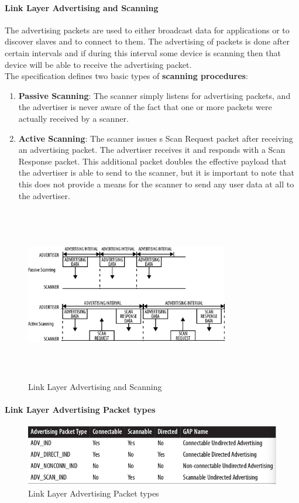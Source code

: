 \paragraph{Link Layer Advertising and Scanning}
The advertising packets are used to either broadcast data for applications or to discover slaves and to connect to them. The advertising of packets is done after certain intervals and if during this interval some device is scanning then that device will be able to receive the advertising packet.\\
The specification defines two basic types of \textbf{scanning procedures}:
\begin{enumerate}
	\item \textbf{Passive Scanning}: The scanner simply listens for advertising packets, and the advertiser is never aware of the fact that one or more packets were actually received by a scanner.
	\item \textbf{Active Scanning}: The scanner issues s Scan Request packet after receiving an advertising packet. The advertiser receives it and responds with a Scan Response packet. This additional packet doubles the effective payload that the advertiser is able to send to the scanner, but it is important to note that this does not provide a means for the scanner to send any user data at all to the advertiser.
\end{enumerate}
\begin{figure}[ht]
	\centering
	\includegraphics[width=3.5in, height=3in]{images/advertising_scanning.png}
	\caption{Link Layer Advertising and Scanning}
\end{figure}
\paragraph{Link Layer Advertising Packet types}
\begin{figure}[ht]
	\centering
	\includegraphics[scale=0.5]{images/advertising_packet_types.png}
	\caption{Link Layer Advertising Packet types}
\end{figure}
